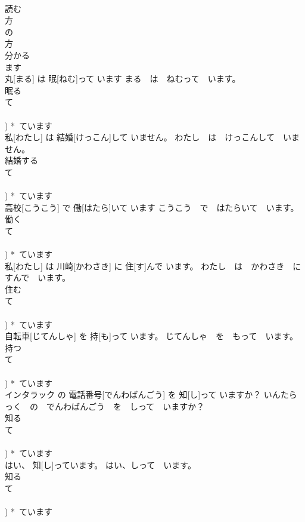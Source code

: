 \documentclass[8pt]{extreport}
\begin{document}
\begin{CJK}{UTF8}{min}
\\	読む 
\\	方 
\\	の
\\	方 
\\	分かる 
\\	ます 
\\	丸[まる] は 眠[ねむ]って います	まる　は　ねむって　います。	
\\	眠る 
\\	て 
\\	[る/つ/う] 
\\	[って])	*~ています 
\\	私[わたし] は 結婚[けっこん]して いません。	わたし　は　けっこんして　いません。	
\\	結婚する 
\\	て 
\\	[する] 
\\	[して])	*~ています 
\\	高校[こうこう] で 働[はたら]いて います	こうこう　で　はたらいて　います。	
\\	働く 
\\	て 
\\	[く/ぐ] 
\\	[いて/いで])	*~ています 
\\	私[わたし] は 川崎[かわさき] に 住[す]んで います。	わたし　は　かわさき　に　すんで　います。	
\\	住む 
\\	て 
\\	[む/ぶ/ぬ] 
\\	[んで])	*~ています 
\\	自転車[じてんしゃ] を 持[も]って います。	じてんしゃ　を　もって　います。	
\\	持つ 
\\	て 
\\	[る/つ/う] 
\\	[って])	*~ています 
\\	インタラック の 電話番号[でんわばんごう] を 知[し]って いますか？	いんたらっく　の　でんわばんごう　を　しって　いますか？	
\\	知る 
\\	て 
\\	[る/つ/う] 
\\	[って])	*~ています 
\\	はい、 知[し]っています。	はい、しって　います。	
\\	知る 
\\	て 
\\	[る/つ/う] 
\\	[って])	*~ています 

\end{CJK}
\end{document}
